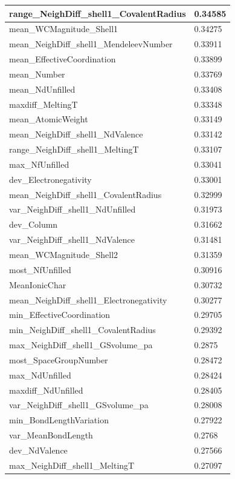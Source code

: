 \begin{longtable}{|l|l|}
range\_NeighDiff\_shell1\_CovalentRadius & 0.34585 \\ \hline
mean\_WCMagnitude\_Shell1 & 0.34275 \\ \hline
mean\_NeighDiff\_shell1\_MendeleevNumber & 0.33911 \\ \hline
mean\_EffectiveCoordination & 0.33899 \\ \hline
mean\_Number & 0.33769 \\ \hline
mean\_NdUnfilled & 0.33408 \\ \hline
maxdiff\_MeltingT & 0.33348 \\ \hline
mean\_AtomicWeight & 0.33149 \\ \hline
mean\_NeighDiff\_shell1\_NdValence & 0.33142 \\ \hline
range\_NeighDiff\_shell1\_MeltingT & 0.33107 \\ \hline
max\_NfUnfilled & 0.33041 \\ \hline
dev\_Electronegativity & 0.33001 \\ \hline
mean\_NeighDiff\_shell1\_CovalentRadius & 0.32999 \\ \hline
var\_NeighDiff\_shell1\_NdUnfilled & 0.31973 \\ \hline
dev\_Column & 0.31662 \\ \hline
var\_NeighDiff\_shell1\_NdValence & 0.31481 \\ \hline
mean\_WCMagnitude\_Shell2 & 0.31359 \\ \hline
most\_NfUnfilled & 0.30916 \\ \hline
MeanIonicChar & 0.30732 \\ \hline
mean\_NeighDiff\_shell1\_Electronegativity & 0.30277 \\ \hline
min\_EffectiveCoordination & 0.29705 \\ \hline
min\_NeighDiff\_shell1\_CovalentRadius & 0.29392 \\ \hline
max\_NeighDiff\_shell1\_GSvolume\_pa & 0.2875 \\ \hline
most\_SpaceGroupNumber & 0.28472 \\ \hline
max\_NdUnfilled & 0.28424 \\ \hline
maxdiff\_NdUnfilled & 0.28405 \\ \hline
var\_NeighDiff\_shell1\_GSvolume\_pa & 0.28008 \\ \hline
min\_BondLengthVariation & 0.27922 \\ \hline
var\_MeanBondLength & 0.2768 \\ \hline
dev\_NdValence & 0.27566 \\ \hline
max\_NeighDiff\_shell1\_MeltingT & 0.27097 \\ \hline

\end{longtable}

